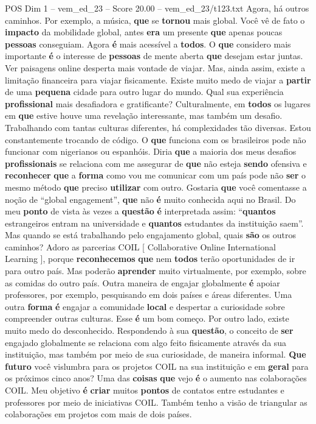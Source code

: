 \begin{textsample}{POS Dim 1 – vem\_ed\_23 – Score 20.00 – vem\_ed\_23/t123.txt}
Agora, há outros caminhos.
Por exemplo, a música, \textbf{que} se \textbf{tornou} mais global.
Você vê de fato o \textbf{impacto} da mobilidade global, antes \textbf{era} um presente \textbf{que} apenas poucas \textbf{pessoas} conseguiam.
Agora \textbf{é} mais acessível a \textbf{todos}.
O \textbf{que} considero mais importante \textbf{é} o interesse de \textbf{pessoas} de mente aberta \textbf{que} desejam estar juntas.
Ver paisagens online desperta mais vontade de viajar.
Mas, ainda assim, existe a limitação financeira para viajar fisicamente.
Existe muito medo de viajar a \textbf{partir} de uma \textbf{pequena} cidade para outro lugar do mundo.
Qual sua experiência \textbf{profissional} mais desafiadora e gratificante?
Culturalmente, em \textbf{todos} os lugares em \textbf{que} estive houve uma revelação interessante, mas também um desafio.
Trabalhando com tantas culturas diferentes, há complexidades tão diversas.
Estou constantemente trocando de código.
O \textbf{que} funciona com os brasileiros pode não funcionar com nigerianos ou espanhóis.
Diria \textbf{que} a maioria dos meus desafios \textbf{profissionais} se relaciona com me assegurar de \textbf{que} não esteja \textbf{sendo} ofensiva e \textbf{reconhecer} \textbf{que} a \textbf{forma} como vou me comunicar com um país pode não \textbf{ser} o mesmo método \textbf{que} preciso \textbf{utilizar} com outro.
Gostaria \textbf{que} você comentasse a noção de “global engagement”, \textbf{que} não \textbf{é} muito conhecida aqui no Brasil.
Do meu \textbf{ponto} de vista às vezes a \textbf{questão} \textbf{é} interpretada assim: “\textbf{quantos} estrangeiros entram na universidade e \textbf{quantos} estudantes da instituição saem”.
Mas quando se está trabalhando pelo engajamento global, quais \textbf{são} os outros caminhos?
Adoro as parcerias COIL [ Collaborative Online International Learning ], porque \textbf{reconhecemos} \textbf{que} nem \textbf{todos} terão oportunidades de ir para outro país.
Mas poderão \textbf{aprender} muito virtualmente, por exemplo, sobre as comidas do outro país.
Outra maneira de engajar globalmente \textbf{é} apoiar professores, por exemplo, pesquisando em dois países e áreas diferentes.
Uma outra \textbf{forma} \textbf{é} engajar a comunidade \textbf{local} e despertar a curiosidade sobre compreender outras culturas.
Esse \textbf{é} um bom começo.
Por outro lado, existe muito medo do desconhecido.
Respondendo à sua \textbf{questão}, o conceito de \textbf{ser} engajado globalmente se relaciona com algo feito fisicamente através da sua instituição, mas também por meio de sua curiosidade, de maneira informal. \textbf{Que} \textbf{futuro} você vislumbra para os projetos COIL na sua instituição e em \textbf{geral} para os próximos cinco anos?
Uma das \textbf{coisas} \textbf{que} vejo \textbf{é} o aumento nas colaborações COIL.
Meu objetivo \textbf{é} \textbf{criar} muitos \textbf{pontos} de contatos entre estudantes e professores por meio de iniciativas COIL.
Também tenho a visão de triangular as colaborações em projetos com mais de dois países.


\end{textsample}
